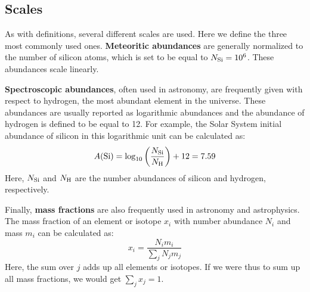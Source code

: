 
\subsection{Scales}

As with definitions, several different scales are used. Here we define the three most commonly used ones. \textbf{Meteoritic abundances} are generally normalized to the number of silicon atoms, which is set to be equal to $N_\textnormal{Si} = 10^{6}$. These abundances scale linearly.

\textbf{Spectroscopic abundances}, often used in astronomy, are frequently given with respect to hydrogen, the most abundant element in the universe. These abundances are usually reported as logarithmic abundances and the abundance of hydrogen is defined to be equal to 12. For example, the Solar System initial abundance of silicon in this logarithmic unit can be calculated as:
\begin{equation}
    A(\textnormal{Si}) = \log_{10} \left( \frac{N_\textnormal{Si}}{N_\textnormal{H}}\right) + 12 = 7.59
\end{equation}
Here, $N_\textnormal{Si}$ and $N_\textnormal{H}$ are the number abundances of silicon and hydrogen, respectively.

Finally, \textbf{mass fractions} are also frequently used in astronomy and astrophysics. The mass fraction of an element or isotope $x_i$ with number abundance $N_i$ and mass $m_i$ can be calculated as:
\begin{equation}
    x_i = \frac{N_i m_i}{\sum_j N_j m_j}
\end{equation}
Here, the sum over $j$ adds up all elements or isotopes. If we were thus to sum up all mass fractions, we would get $\sum_j x_j = 1$.


